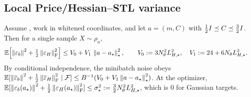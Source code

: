 \subsection{Local Price/Hessian--STL variance}
\label{subsec:local-var}

\begin{lemma}
\label{lem:local-variance}
Assume , work in whitened coordinates, and let
$a=(m,C)$ with $\tfrac12I\preceq C\preceq\tfrac32I$. Then for a single sample $X\sim\rho_a$,
\begin{equation}
\label{eq:local-var}
    \mathbb{E}\Bigl[\left\lVert \varepsilon_b\right\rVert^2+\tfrac12\left\lVert \varepsilon_H\right\rVert_{\mathrm{F}}^2\Bigr]
    \leq V_0+V_1\,\left\lVert a-a_\star\right\rVert_\star^2,
    \qquad
    V_0:=3N_\theta^2L_{H,\star}^2,\quad V_1:=24+6N_\theta L_{H,\star}^2 .
\end{equation}
By conditional independence, the minibatch noise obeys
$\mathbb{E}[\left\lVert \overline\varepsilon_b\right\rVert^2+\tfrac12\left\lVert \overline\varepsilon_H\right\rVert_{\mathrm{F}}^2\mid\mathcal{F}]\leq B^{-1}(V_0+V_1\left\lVert a-a_\star\right\rVert_\star^2)$.
At the optimizer, $\mathbb{E}[\left\lVert \varepsilon_b(a_\star)\right\rVert^2+\tfrac12\left\lVert \varepsilon_H(a_\star)\right\rVert_{\mathrm{F}}^2]\leq\sigma_\star^2:=\tfrac32N_\theta^2L_{H,\star}^2$,
which is $0$ for Gaussian targets.
\end{lemma}

